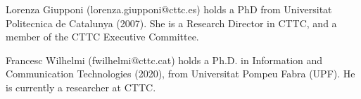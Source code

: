 \documentclass[journal]{IEEEtran}
\begin{document}
	\ifCLASSOPTIONcaptionsoff
	\newpage
	\fi
	
	
	
	
	\vspace{-.7cm}
	\begin{IEEEbiographynophoto}{Lorenza Giupponi}
		(lorenza.giupponi@cttc.es) holds  a  PhD  from  Universitat  Politecnica  de  Catalunya
		(2007). She is a Research Director in CTTC, and a member of the CTTC Executive Committee.
	\end{IEEEbiographynophoto}
	\vspace{-.5cm}
	\begin{IEEEbiographynophoto}{Francesc Wilhelmi}
		(fwilhelmi@cttc.cat) holds a Ph.D. in Information and Communication Technologies (2020), from Universitat Pompeu Fabra (UPF). He is currently a researcher at CTTC. 
	\end{IEEEbiographynophoto}
	
\end{document}
